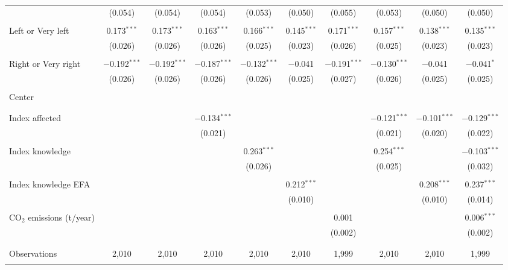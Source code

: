 \begin{tabular}{@{\extracolsep{5pt}}lccccccccc}
  & (0.054) & (0.054) & (0.054) & (0.053) & (0.050) & (0.055) & (0.053) & (0.050) & (0.050) \\ 
  & & & & & & & & & \\ 
 Left or Very left & 0.173$^{***}$ & 0.173$^{***}$ & 0.163$^{***}$ & 0.166$^{***}$ & 0.145$^{***}$ & 0.171$^{***}$ & 0.157$^{***}$ & 0.138$^{***}$ & 0.135$^{***}$ \\ 
  & (0.026) & (0.026) & (0.026) & (0.025) & (0.023) & (0.026) & (0.025) & (0.023) & (0.023) \\ 
  & & & & & & & & & \\ 
 Right or Very right & $-$0.192$^{***}$ & $-$0.192$^{***}$ & $-$0.187$^{***}$ & $-$0.132$^{***}$ & $-$0.041 & $-$0.191$^{***}$ & $-$0.130$^{***}$ & $-$0.041 & $-$0.041$^{*}$ \\ 
  & (0.026) & (0.026) & (0.026) & (0.026) & (0.025) & (0.027) & (0.026) & (0.025) & (0.025) \\ 
  & & & & & & & & & \\ 
 Center &  &  &  &  &  &  &  &  &  \\ 
  &  &  &  &  &  &  &  &  &  \\ 
  & & & & & & & & & \\ 
 Index affected &  &  & $-$0.134$^{***}$ &  &  &  & $-$0.121$^{***}$ & $-$0.101$^{***}$ & $-$0.129$^{***}$ \\ 
  &  &  & (0.021) &  &  &  & (0.021) & (0.020) & (0.022) \\ 
  & & & & & & & & & \\ 
 Index knowledge &  &  &  & 0.263$^{***}$ &  &  & 0.254$^{***}$ &  & $-$0.103$^{***}$ \\ 
  &  &  &  & (0.026) &  &  & (0.025) &  & (0.032) \\ 
  & & & & & & & & & \\ 
 Index knowledge EFA &  &  &  &  & 0.212$^{***}$ &  &  & 0.208$^{***}$ & 0.237$^{***}$ \\ 
  &  &  &  &  & (0.010) &  &  & (0.010) & (0.014) \\ 
  & & & & & & & & & \\ 
 CO$_{2}$ emissions (t/year) &  &  &  &  &  & 0.001 &  &  & 0.006$^{***}$ \\ 
  &  &  &  &  &  & (0.002) &  &  & (0.002) \\ 
  & & & & & & & & & \\ 
\hline \\[-1.8ex] 

Observations & 2,010 & 2,010 & 2,010 & 2,010 & 2,010 & 1,999 & 2,010 & 2,010 & 1,999 \\ 
\hline 
\hline \\[-1.8ex] 
\end{tabular} 